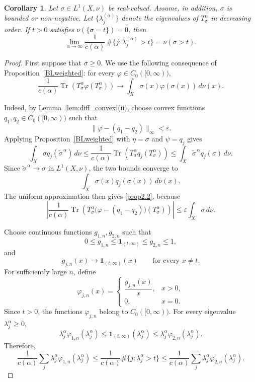 \documentclass{amsart}
\newtheorem{cor}[thm]{Corollary}
\theoremstyle{definition}
\theoremstyle{remark}
\numberwithin{equation}{section}
\begin{document}
\begin{cor}
\label{cor:eig-count-sigma}
Let $\sigma\in L^1(X,\nu)$ be real-valued. Assume, in addition, $\sigma$ is bounded or non-negative. 
Let $\{\lambda_j^{(\alpha)}\}$ denote the eigenvalues of $T^\alpha_\sigma$ in
decreasing order.  If $t>0$ satisfies $\nu(\{\sigma=t\})=0$, then
\[
\lim_{\alpha\to\infty}
\frac{1}{c(\alpha)}\,\#\{j:\lambda_j^{(\alpha)}>t\}
=
\nu(\sigma>t).
\]
\end{cor}

\begin{proof} 
First suppose that $\sigma\geq0$. We use the following consequence of
Proposition~\ref{BLweighted}: for every $\varphi\in C_0([0,\infty))$,
\begin{equation}\label{prop2.2}
\frac{1}{c(\alpha)}
\operatorname{Tr}\!\left(
T_\sigma^\alpha\varphi(T_\sigma^\alpha)
\right)
\longrightarrow
\int_X\sigma(x)\varphi(\sigma(x))\,d\nu(x).
\end{equation}

Indeed, by Lemma~\ref{lem:diff_convex}(ii), choose convex functions
$q_1,q_2\in C_0([0,\infty))$ such that
\[
\|\varphi-(q_1-q_2)\|_\infty<\varepsilon.
\]
Applying Proposition~\ref{BLweighted} with $\eta=\sigma$ and $\psi=q_j$ gives
\[
\int_X\sigma q_j(\widetilde{\sigma}^{\,\alpha})\,d\nu
\leq
\frac{1}{c(\alpha)}
\operatorname{Tr}\!\left(
T_\sigma^\alpha q_j(T_\sigma^\alpha)
\right)
\leq
\int_X\widetilde{\sigma}^{\,\alpha}q_j(\sigma)\,d\nu.
\]
Since $\widetilde{\sigma}^{\,\alpha}\to\sigma$ in $L^1(X,\nu)$,
the two bounds converge to
\[
\int_X\sigma(x)q_j(\sigma(x))\,d\nu(x).
\]
The uniform approximation then gives \eqref{prop2.2}, because
\[
\left|
\frac{1}{c(\alpha)}
\operatorname{Tr}\!\left(
T_\sigma^\alpha
\bigl(\varphi-(q_1-q_2)\bigr)(T_\sigma^\alpha)
\right)
\right|
\leq
\varepsilon\int_X\sigma\,d\nu.
\]

Choose continuous functions $g_{1,n},g_{2,n}$ such that
\[
0\leq g_{1,n}
\leq \mathbf 1_{(t,\infty)}
\leq g_{2,n}\leq1,
\]
and
\[
g_{j,n}(x)\longrightarrow \mathbf 1_{(t,\infty)}(x)
\qquad\text{for every }x\neq t.
\]
For sufficiently large $n$, define
\[
\varphi_{j,n}(x)
=
\begin{cases}
\dfrac{g_{j,n}(x)}{x},&x>0,\\[2mm]
0,&x=0.
\end{cases}
\]
Since $t>0$, the functions $\varphi_{j,n}$ belong to
$C_0([0,\infty))$. For every eigenvalue $\lambda_j^\alpha\geq0$,
\[
\lambda_j^\alpha\varphi_{1,n}(\lambda_j^\alpha)
\leq
\mathbf 1_{(t,\infty)}(\lambda_j^\alpha)
\leq
\lambda_j^\alpha\varphi_{2,n}(\lambda_j^\alpha).
\]
Therefore,
\[
\frac{1}{c(\alpha)}
\sum_j\lambda_j^\alpha
\varphi_{1,n}(\lambda_j^\alpha)
\leq
\frac{1}{c(\alpha)}
\#\{j:\lambda_j^\alpha>t\}
\leq
\frac{1}{c(\alpha)}
\sum_j\lambda_j^\alpha
\varphi_{2,n}(\lambda_j^\alpha).
\]


\end{proof}
\end{document}
